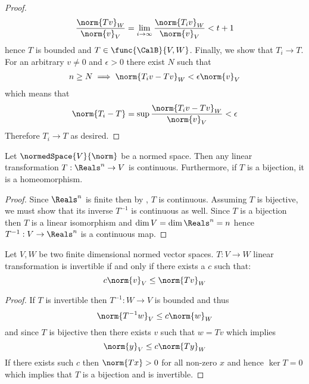 \begin{proof}
    \begin{equation*}
        \dfrac{\norm{Tv}_W}{\norm{v}_V} = \lim_{i \to \infty}  \dfrac{\norm{T_i v}_W}{\norm{v}_V} < t + 1
    \end{equation*}
    hence \(T\) is bounded and \(T \in \func{\CalB}{V,W}\). Finally, we show that \(T_i \to T\). For an arbitrary \(v \neq 0\) and \(\epsilon > 0\) there exist \(N\) such that
    \begin{align*}
        n \geq N \implies \norm{T_i v - Tv}_W < \epsilon \norm{v}_V
    \end{align*}
    which means that
    \begin{equation*}
        \norm{T_i - T} = \sup \dfrac{\norm{T_i v - Tv}_W}{\norm{v}_V} < \epsilon
    \end{equation*}
    Therefore \(T_i \to T\) as desired.
\end{proof}

\begin{theorem}
    Let \(\normedSpace{V}{\norm}\) be a normed space. Then any linear transformation \(T: \Reals^n \to V\) is continuous. Furthermore, if \(T\) is a bijection, it is a homeomorphism.
\end{theorem}

\begin{proof}
    Since \(\Reals^n\) is finite then by , \(T\) is continuous. Assuming \(T\) is bijective, we must show that its inverse \(T^{-1}\) is continuous as well. Since \(T\) is a bijection then \(T\) is a linear isomorphism and \(\dim V = \dim \Reals^n = n\) hence \(T^{-1}: V \to \Reals^n\) is a continuous map.
\end{proof}


\begin{theorem} \label{th:LinearInvertibility}
    Let \(V,W\) be two finite dimensional normed vector spaces. \(T : V \to W\) linear transformation is invertible if and only if there exists a \(c\) such that:
    \begin{equation*}
        c \norm{v}_V \leq \norm{Tv}_W
    \end{equation*}
\end{theorem}

\begin{proof}
    If \(T\) is invertible then \(T^{-1} : W \to V \) is bounded and thus
    \begin{equation*}
        \norm{T^{-1}w}_V \leq c \norm{w}_W
    \end{equation*}
    and since \(T\) is bijective then there exists \(v\) such that \(w = Tv\) which implies
    \begin{equation*}
        \norm{y}_V \leq c\norm{Ty}_W
    \end{equation*}
    If there exists such \(c\) then \(\norm{Tx} > 0\) for all non-zero \(x\) and hence \(\ker T  = 0\) which implies that \(T\) is a bijection and is invertible.
\end{proof}

